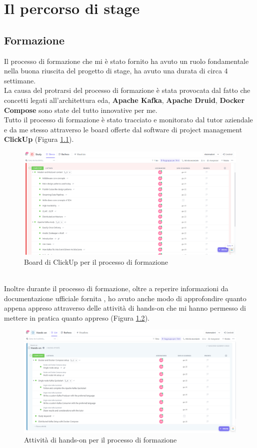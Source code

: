 \chapter{Il percorso di stage }\label{cap:Il_percorso}
\section{Formazione}
Il processo di formazione che mi è stato fornito ha avuto un ruolo fondamentale nella buona riuscita del progetto di stage, 
ha avuto una durata di circa 4 settimane. \\
La causa del protrarsi del processo di formazione è stata provocata dal fatto che concetti legati all'architettura \gls{eda}{},
\textbf{Apache Kafka}, \textbf{Apache Druid}, \textbf{Docker Compose} sono state del tutto innovative per me.\\
Tutto il processo di formazione è stato tracciato e monitorato dal tutor aziendale e da me stesso attraverso le \gls{board}{} offerte 
dal software di project management \textbf{ClickUp} (Figura \ref{cap:ClickUp}).\\
\begin{figure}[h]
    \centering
    \includegraphics[width=1\textwidth]{images/percorso/formazione.png}
    \caption{Board di ClickUp per il processo di formazione}
    \label{cap:ClickUp}
\end{figure}
\pagebreak
\\
Inoltre durante il processo di formazione, oltre a reperire informazioni da documentazione ufficiale fornita , ho avuto anche modo 
di approfondire quanto appena appreso attraverso delle attività di \gls{hands-on}{} che mi hanno permesso di mettere in pratica quanto appreso (Figura \ref{cap:Hands-on}).
\begin{figure}[h]
    \centering
    \includegraphics[width=1\textwidth]{images/percorso/hands_on.png}
    \caption{Attività di hands-on per il processo di formazione}
    \label{cap:Hands-on}
\end{figure}
